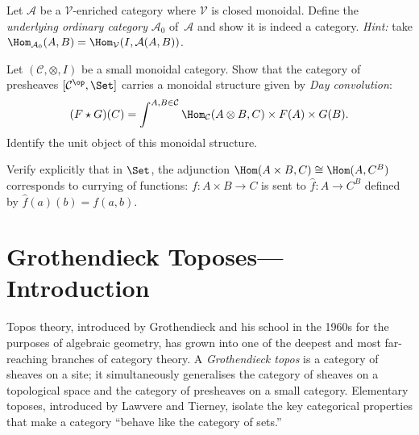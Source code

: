 \begin{exercise}\label{ex:enriched-underlying}
Let $\mathcal{A}$ be a $\mathcal{V}$-enriched category where
$\mathcal{V}$ is closed monoidal.  Define the \emph{underlying ordinary
category} $\mathcal{A}_0$ of~$\mathcal{A}$ and show it is indeed a category.
\textit{Hint:} take $\Hom_{\mathcal{A}_0}(A,B) = \Hom_\mathcal{V}(I, \mathcal{A}(A,B))$.
\end{exercise}

\begin{exercise}\label{ex:day-convolution}
Let $(\mathcal{C}, \otimes, I)$ be a small monoidal category.
Show that the category of presheaves $[\mathcal{C}^{\op}, \Set]$ carries
a monoidal structure given by \emph{Day convolution}:
\[
    (F\star G)(C)
    = \int^{A,B\in\mathcal{C}} \Hom_\mathcal{C}(A\otimes B, C)
      \times F(A)\times G(B).
\]
Identify the unit object of this monoidal structure.
\end{exercise}

\begin{exercise}\label{ex:ccc-lambda}
Verify explicitly that in $\Set$, the adjunction
$\Hom(A\times B, C)\cong\Hom(A, C^B)$ corresponds to currying of functions:
$f\colon A\times B\to C$ is sent to $\hat{f}\colon A\to C^B$ defined by
$\hat{f}(a)(b) = f(a,b)$.
\end{exercise}




\chapter{Grothendieck Toposes---Introduction}\label{ch:toposes}
\minitoc

\vspace{1em}

Topos theory, introduced by Grothendieck and his school in the 1960s
for the purposes of algebraic geometry, has grown into one of the deepest
and most far-reaching branches of category theory.  A \emph{Grothendieck
topos} is a category of sheaves on a site; it simultaneously generalises
the category of sheaves on a topological space and the category of
presheaves on a small category.  Elementary toposes, introduced by
Lawvere and Tierney, isolate the key categorical properties that make
a category ``behave like the category of sets.''

